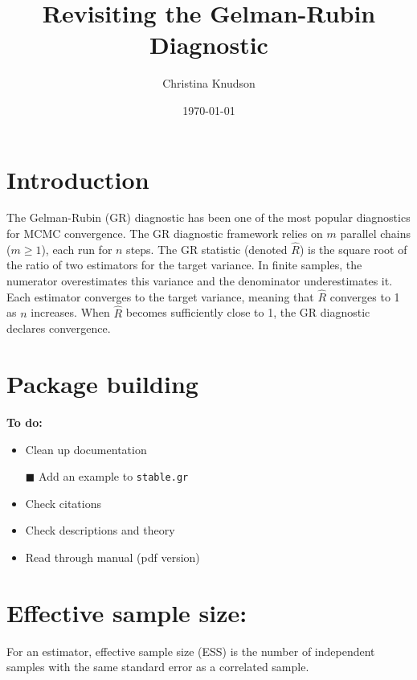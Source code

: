\documentclass[12pt]{article}
\theoremstyle{remark}
\begin{document}
\title{Revisiting the Gelman-Rubin Diagnostic}
\date{\today}
\author{Christina Knudson}
\maketitle


\section{Introduction} %
\label{sec:introduction}

The Gelman-Rubin (GR) diagnostic has been one of the most popular diagnostics for MCMC convergence. The GR diagnostic framework relies on  $m$  parallel chains ($m \geq 1$), each run for $n$ steps. The GR statistic (denoted $\hat{R}$) is the square root of the ratio of two estimators for the target variance.  In finite samples, the numerator overestimates this variance and the denominator underestimates it. Each estimator converges to the target variance, meaning that $\hat{R}$ converges to 1 as $n$ increases. When $\hat{R}$ becomes sufficiently close to 1, the GR diagnostic declares convergence. 












\section{\textbf{Package building}}
\textbf{To do:}
\begin{itemize}
 \renewcommand{\labelitemi}{$\square$}
\item Clean up documentation
\item[$\blacksquare$] Add an example to \texttt{stable.gr} 
\item Check citations
\item Check descriptions and theory
\item Read through manual (pdf version)
\end{itemize}


\section{Effective sample size: \checkmark} %
\label{sec:choosing_delta}

For an estimator, effective sample size (ESS) is the number of independent samples with the same standard error as a correlated sample. 
\end{document}
